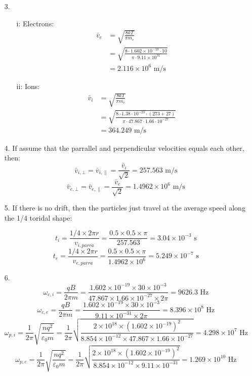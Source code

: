 \documentclass{article}
\begin{document}
\begin{itemize}
    \item [3.]
    \begin{itemize}
        \item [i:] Electrons:
        \begin{align*}
            \bar{v}_e &=\sqrt{\frac{8kT}{\pi m_e}}\\
                & = \sqrt{\frac{8\cdot1.602\times 10^{-19}\cdot 10}{\pi\cdot 9.11\times10^{31}}}\\
                &=2.116\times 10^6 \text{ m/s}
        \end{align*}
        \item[ii:] Ions:
        \begin{align*}
            \bar{v}_i &=\sqrt{\frac{8kT}{\pi m_e}}\\
            &=\sqrt{\frac{8\cdot 1.38\cdot10^{-23}\cdot (273+27)}{\pi\cdot 47.867\cdot 1.66\cdot 10^{-27}}}\\
            &=364.249\text{ m/s}
        \end{align*}
    \end{itemize}
    \item[4.]
    If assume that the parrallel and perpendicular velocities equals each other, then:\\
    \[\bar{v}_{i,\bot} =\bar{v}_{i,\parallel}  = \frac{\bar{v}_{i}}{\sqrt2} = 257.563\text{ m/s}\]
    \[\bar{v}_{e,\bot} =\bar{v}_{e,\parallel}  = \frac{\bar{v}_{e}}{\sqrt2} = 1.4962\times 10 ^6 \text{ m/s}\]
    \item[5.] If there is no drift, then the particles just travel at the average speed along the 1/4 toridal shape:
    \item[] \[t_i = \frac{1/4 \times 2\pi r}{v_{i,parra}} = \frac{0.5\times 0.5\times \pi}{257.563} = 3.04\times 10^{-3}\text{ s}\]
    \[t_e = \frac{1/4 \times 2\pi r}{v_{e,parra}} = \frac{0.5\times 0.5\times \pi}{1.4962\times 10 ^6} = 5.249\times 10^{-7}\text{ s}\]
    \item[6.]
    \[\omega_{c,i} = \frac{qB}{2\pi m}=\frac{1.602\times 10^{-19}\times 30\times 10^{-3}}{47.867\times 1.66\times 10^{-27}\times 2\pi} = 9626.3 \text{ Hz}\]
    \[\omega_{c,e} = \frac{qB}{2\pi m}=\frac{1.602\times 10^{-19}\times 30\times 10^{-3}}{9.11\times 10^{-31}\times 2\pi} = 8.396\times 10^{8} \text{ Hz}\]
    \[\omega_{p,i} = \frac{1}{2\pi}\sqrt{\frac{nq^2}{\varepsilon_0m }} = \frac{1}{2\pi}\sqrt{\frac{2\times 10^{18}\times (1.602\times 10^{-19})^2}{8.854\times 10^{-12}\times 47.867\times 1.66\times 10^{-27}}} = 4.298\times 10^{7} \text{ Hz}\]
    \[\omega_{p,e} = \frac{1}{2\pi}\sqrt{\frac{nq^2}{\varepsilon_0m }} = \frac{1}{2\pi}\sqrt{\frac{2\times 10^{18}\times (1.602\times 10^{-19})^2}{8.854\times 10^{-12}\times 9.11\times 10^{-31}}} = 1.269\times 10^{10} \text{ Hz}\]

\end{itemize}
\end{document}
